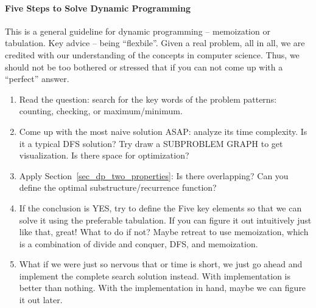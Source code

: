 \documentclass[../main.tex]{subfiles}
\begin{document}


\paragraph{Five Steps to Solve Dynamic Programming} This is a general guideline for dynamic programming -- memoization or tabulation. Key advice -- being ``flexbile''.  Given a real problem, all in all, we are credited with our understanding of the concepts in computer science. Thus, we should not be too bothered or stressed that if you can not come up with a ``perfect'' answer.  
\label{sec_dp_generalization}
\begin{enumerate}
    \item Read the question: search for the key words of the problem patterns: counting, checking, or maximum/minimum.
    \item Come up with the most naive solution ASAP:  analyze its time complexity. Is it a typical DFS solution? Try draw a SUBPROBLEM GRAPH to get visualization. Is there space for optimization?
    \item Apply Section~\ref{sec_dp_two_properties}: Is there overlapping? Can you define the optimal substructure/recurrence function?
    \item If the conclusion is YES, try to define the Five key elements so that we can solve it using the preferable tabulation. If you can figure it out intuitively just like that, great! What to do if not? Maybe retreat to use memoization, which is a combination of divide and conquer,  DFS, and memoization. 
    \item What if we were just so nervous that or time is short, we just go ahead and implement the complete search solution instead. With implementation is better than nothing. With the implementation in hand, maybe we can figure it out later. 
\end{enumerate}
\end{document}
